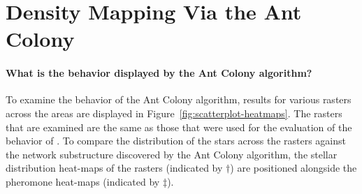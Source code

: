 \newpage
\section{\label{sec:eval-ant}Density Mapping Via the Ant Colony}

\paragraph{What is the behavior displayed by the Ant Colony algorithm?}\paragraphnewline{}
\noindent To examine the behavior of the Ant Colony algorithm, results for
various rasters across the areas are displayed in
Figure~\ref{fig:scatterplot-heatmaps}. The rasters that are examined are the
same as those that were used for the evaluation of the behavior of \blobdog{}.
To compare the distribution of the stars across the rasters against the network
substructure discovered by the Ant Colony algorithm, the stellar distribution
heat-maps of the rasters (indicated by $\dagger$) are positioned alongside the
pheromone heat-maps (indicated by $\ddagger$).


